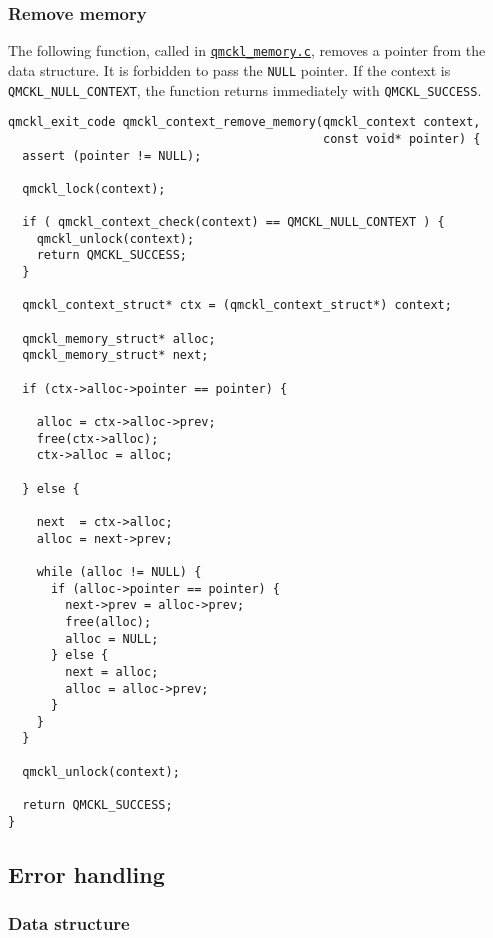 \subsubsection{Remove memory}
\label{sec:org3fef27a}

The following function, called in \href{./qmckl\_memory.html}{\texttt{qmckl\_memory.c}}, removes a 
pointer from the data structure.
It is forbidden to pass the \texttt{NULL} pointer.
If the context is \texttt{QMCKL\_NULL\_CONTEXT}, the function returns
immediately with \texttt{QMCKL\_SUCCESS}.

\begin{verbatim}
qmckl_exit_code qmckl_context_remove_memory(qmckl_context context,
                                            const void* pointer) {
  assert (pointer != NULL);

  qmckl_lock(context);

  if ( qmckl_context_check(context) == QMCKL_NULL_CONTEXT ) {
    qmckl_unlock(context);
    return QMCKL_SUCCESS;
  }

  qmckl_context_struct* ctx = (qmckl_context_struct*) context; 

  qmckl_memory_struct* alloc;
  qmckl_memory_struct* next;

  if (ctx->alloc->pointer == pointer) {

    alloc = ctx->alloc->prev;
    free(ctx->alloc);
    ctx->alloc = alloc;

  } else {

    next  = ctx->alloc;
    alloc = next->prev;

    while (alloc != NULL) {
      if (alloc->pointer == pointer) {
        next->prev = alloc->prev;
        free(alloc);
        alloc = NULL;
      } else {
        next = alloc;
        alloc = alloc->prev;
      }
    }
  }
      
  qmckl_unlock(context);

  return QMCKL_SUCCESS;
}
\end{verbatim}

\subsection{Error handling}
\label{sec:orgd61ab50}

\subsubsection{Data structure}
\label{sec:org31be6ee}

